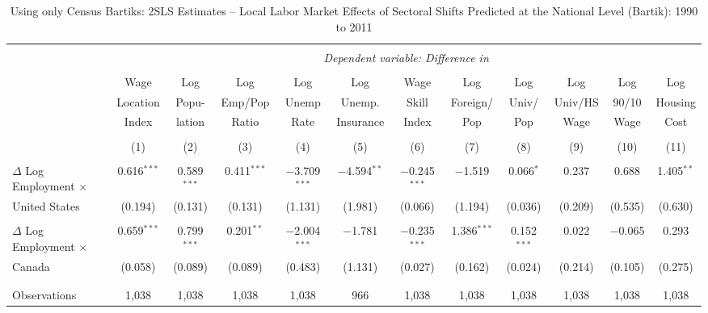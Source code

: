 

\begin{sidewaystable}[!htbp] \centering 
  \caption{Using only Census Bartiks: 2SLS Estimates -- Local Labor Market Effects of Sectoral Shifts Predicted at the National Level (Bartik):  1990 to 2011} 
  \label{tab:bartik_census_2sls} 
\begin{threeparttable}
\begin{tabular}{@{\extracolsep{5pt}}lccccccccccc} 
\\[-1.8ex]\hline 
\hline \\[-1.8ex] 
 & \multicolumn{11}{c}{\textit{Dependent variable: Difference in }} \\ 
\cline{2-12} 
\\[-2.0ex]
 & Wage & Log & Log & Log & Log & Wage & Log & Log & Log & Log & Log \\
 & Location & Popu- & Emp/Pop & Unemp & Unemp. & Skill & Foreign/ & Univ/ & Univ/HS & 90/10 & Housing \\
 & Index & lation & Ratio & Rate & Insurance & Index & Pop & Pop & Wage & Wage & Cost \\
\\[-1.8ex] & (1) & (2) & (3) & (4) & (5) & (6) & (7) & (8) & (9) & (10) & (11)\\ 
\hline \\[-1.8ex] 
 $\Delta$ Log Employment $\times$ & 0.616$^{***}$ & 0.589$^{***}$ & 0.411$^{***}$ & $-$3.709$^{***}$ & $-$4.594$^{**}$ & $-$0.245$^{***}$ & $-$1.519 & 0.066$^{*}$ & 0.237 & 0.688 & 1.405$^{**}$ \\ 
United States  & (0.194) & (0.131) & (0.131) & (1.131) & (1.981) & (0.066) & (1.194) & (0.036) & (0.209) & (0.535) & (0.630) \\ 
  & & & & & & & & & & & \\ 
 $\Delta$ Log Employment $\times$ & 0.659$^{***}$ & 0.799$^{***}$ & 0.201$^{**}$ & $-$2.004$^{***}$ & $-$1.781 & $-$0.235$^{***}$ & 1.386$^{***}$ & 0.152$^{***}$ & 0.022 & $-$0.065 & 0.293 \\ 
Canada  & (0.058) & (0.089) & (0.089) & (0.483) & (1.131) & (0.027) & (0.162) & (0.024) & (0.214) & (0.105) & (0.275) \\ 
  & & & & & & & & & & & \\ 
\hline \\[-1.8ex] 
Observations & 1,038 & 1,038 & 1,038 & 1,038 & 966 & 1,038 & 1,038 & 1,038 & 1,038 & 1,038 & 1,038 \\ 

\end{tabular}
\end{threeparttable}
\end{sidewaystable}
